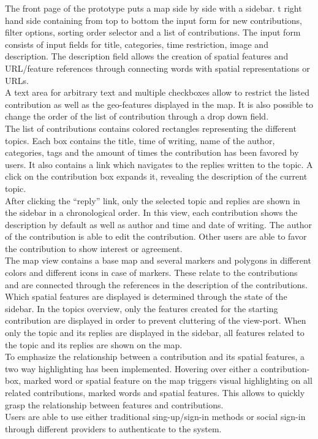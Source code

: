\documentclass{sigchi}
\begin{document}
The front page of the prototype puts a map side by side with a sidebar. t right hand side containing from top to bottom the input form for new contributions, filter options, sorting order selector and a list of contributions. The input form consists of input fields for title, categories, time restriction, image and description. The description field allows the creation of spatial features and URL/feature references through connecting words with spatial representations or URLs.\\
A text area for arbitrary text and multiple checkboxes allow to restrict the listed contribution as well as the geo-features displayed in the map. It is also possible to change the order of the list of contribution through a drop down field.\\
The list of contributions contains colored rectangles representing the different topics. Each box contains the title, time of writing, name of the author, categories, tags and the amount of times the contribution has been favored by users. It also contains a link which navigates to the replies written to the topic. A click on the contribution box expands it, revealing the description of the current topic.\\
After clicking the ``reply'' link, only the selected topic and replies are shown in the sidebar in a chronological order. In this view, each contribution shows the description by default as well as author and time and date of writing. The author of the contribution is able to edit the contribution. Other users are able to favor the contribution to show interest or agreement.\\
The map view contains a base map and several markers and polygons in different colors and different icons in case of markers. These relate to the contributions and are connected through the references in the description of the contributions. Which spatial features are displayed is determined through the state of the sidebar. In the topics overview, only the features created for the starting contribution are displayed in order to prevent cluttering of the view-port. When only the topic and its replies are displayed in the sidebar, all features related to the topic and its replies are shown on the map.\\
To emphasize the relationship between a contribution and its spatial features, a two way highlighting has been implemented. Hovering over either a contribution-box, marked word or spatial feature on the map triggers visual highlighting on all related contributions, marked words and spatial features. This allows to quickly grasp the relationship between features and contributions.\\
Users are able to use either traditional sing-up/sign-in methods or social sign-in through different providers to authenticate to the system.
\end{document}
